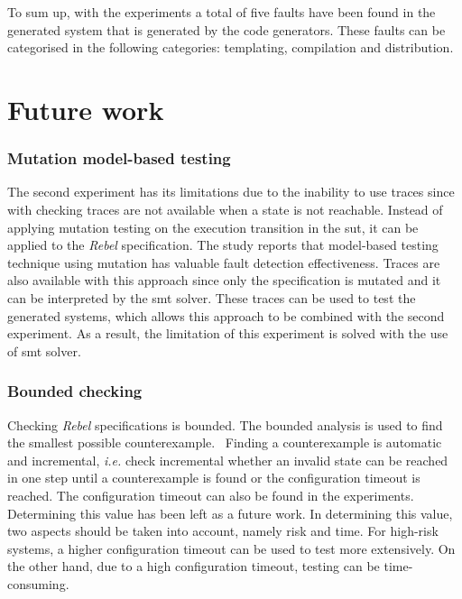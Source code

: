 To sum up, with the experiments a total of five faults have been found in the
generated system that is generated by the code generators.
These faults can be categorised in the following categories: templating,
compilation and distribution.

\clearpage

\section{Future work}

\subsubsection{Mutation model-based testing}

The second experiment has its limitations due to the inability to use traces
since with checking traces are not available when a state is not reachable.
Instead of applying mutation testing on the execution transition in the
\gls{sut}, it can be applied to the \textit{Rebel} specification.
The study \cite{paradkar2005case} reports that model-based testing technique
using mutation has valuable fault detection effectiveness.
Traces are also available with this approach since only the specification is
mutated and it can be interpreted by the \gls{smt} solver.
These traces can be used to test the generated systems, which allows this
approach to be combined with the second experiment. As a result, the limitation
of this experiment is solved with the use of \gls{smt} solver.

\subsubsection{Bounded checking}
Checking \textit{Rebel} specifications is bounded. The bounded analysis is used
to find the smallest possible counterexample.~\cite[p.~5]{stoel_storm_vinju_bosman_2016}
Finding a counterexample is automatic and incremental,
\textit{i.e.} check incremental whether an invalid state can be reached in one
step until a counterexample is found or the configuration timeout is reached.
The configuration timeout can also be found in the experiments.
Determining this value has been left as a future work.
In determining this value, two aspects should be taken into account,
namely risk and time. For high-risk systems, a higher configuration timeout can
be used to test more extensively. On the other hand, due to a high configuration
timeout, testing can be time-consuming.

